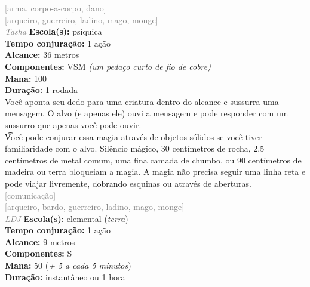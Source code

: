\documentclass{RPG_Adventure}[2021/10/20]
\begin{document}
{\scriptsize \textcolor{gray}{[arma, corpo-a-corpo, dano]\\}}
{\scriptsize \textcolor{gray}{[arqueiro, guerreiro, ladino, mago, monge]\\}}
{\tiny \textcolor{gray}{\textit{Tasha}}}
{\small \t \textbf{Escola(s):} psíquica\\\t \textbf{Tempo conjuração:} 1 ação\\\t \textbf{Alcance:} 36 metros\\\t \textbf{Componentes:} VSM \textit{(um pedaço curto de fio de cobre)}\\\t \textbf{Mana:} 100\\\t \textbf{Duração:} 1 rodada\\}
{\normalsize Você aponta seu dedo para uma criatura dentro do alcance e sussurra uma mensagem. O alvo (e apenas ele) ouvi a mensagem e pode responder com um sussurro que apenas você pode ouvir.\\\t Você pode conjurar essa magia através de objetos sólidos se você tiver familiaridade com o alvo. Silêncio mágico, 30 centímetros de rocha, 2,5 centímetros de metal comum, uma fina camada de chumbo, ou 90 centímetros de madeira ou terra bloqueiam a magia. A magia não precisa seguir uma linha reta e pode viajar livremente, dobrando esquinas ou através de aberturas.\\}
{\scriptsize \textcolor{gray}{[comunicação]\\}}
{\scriptsize \textcolor{gray}{[arqueiro, bardo, guerreiro, ladino, mago, monge]\\}}
{\tiny \textcolor{gray}{\textit{LDJ}}}
{\small \t \textbf{Escola(s):} elemental (\textit{terra})\\\t \textbf{Tempo conjuração:} 1 ação\\\t \textbf{Alcance:} 9 metros\\\t \textbf{Componentes:} S\\\t \textbf{Mana:} 50 (\textit{+ 5 a cada 5 minutos})\\\t \textbf{Duração:} instantâneo ou 1 hora\\}
\end{document}
